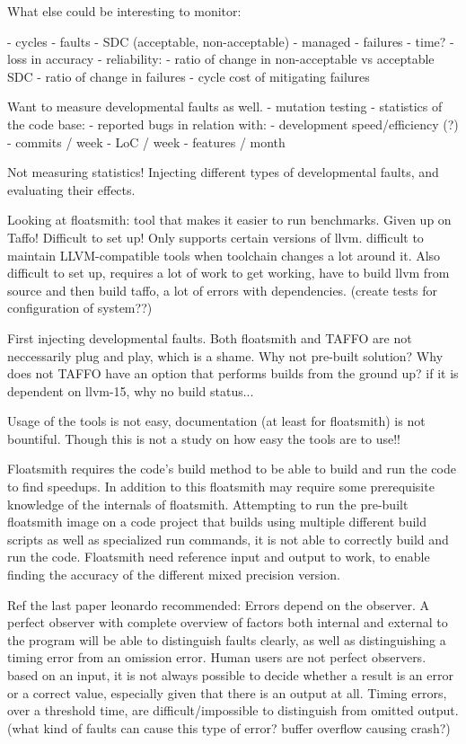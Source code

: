 What else could be interesting to monitor:

- cycles
- faults
    - SDC (acceptable, non-acceptable)
    - managed
    - failures
- time?
- loss in accuracy
- reliability:
    - ratio of change in non-acceptable vs acceptable SDC
    - ratio of change in failures
    - cycle cost of mitigating failures


Want to measure developmental faults as well. 
    - mutation testing
    - statistics of the code base:
        - reported bugs
        in relation with:
        - development speed/efficiency (?) 
            - commits / week
            - LoC / week
            - features / month

Not measuring statistics! 
Injecting different types of developmental faults, and evaluating their effects.

Looking at floatsmith: tool that makes it easier to run benchmarks. Given up on Taffo! Difficult to set up! Only supports certain versions of llvm. difficult to maintain LLVM-compatible tools when toolchain changes a lot around it. Also difficult to set up, requires a lot of work to get working, have to build llvm from source and then build taffo, a lot of errors with dependencies. (create tests for configuration of system??)


First injecting developmental faults.  
Both floatsmith and TAFFO are not neccessarily plug and play, which is a shame. Why not pre-built solution? Why does not TAFFO have an option that performs builds from the ground up? if it is dependent on llvm-15, why no build status...


Usage of the tools is not easy, documentation (at least for floatsmith) is not bountiful. Though this is not a study on how easy the tools are to use!!

Floatsmith requires the code's build method to be able to build and run the code to find speedups. In addition to this floatsmith may require some prerequisite knowledge of the internals of floatsmith. Attempting to run the pre-built floatsmith image on a code project that builds using multiple different build scripts as well as specialized run commands, it is not able to correctly build and run the code. Floatsmith need reference input and output to work, to enable finding the accuracy of the different mixed precision version. 

Ref the last paper leonardo recommended:
Errors depend on the observer. A perfect observer with complete overview of factors both internal and external to the program will be able to distinguish faults clearly, as well as distinguishing a timing error from an omission error.
Human users are not perfect observers. based on an input, it is not always possible to decide whether a result is an error or a correct value, especially given that there is an output at all. 
Timing errors, over a threshold time, are difficult/impossible to distinguish from omitted output.  (what kind of faults can cause this type of error? buffer overflow causing crash?)


